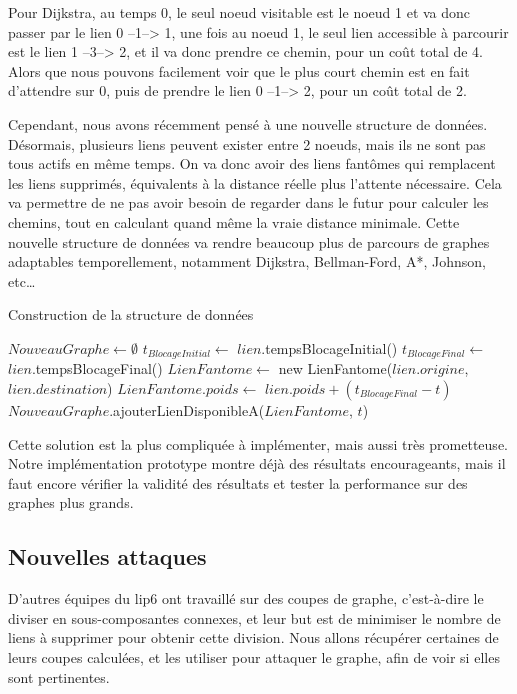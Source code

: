 Pour Dijkstra, au temps 0, le seul noeud visitable est le noeud 1 et va donc passer par le lien 0 --1--> 1, une fois au noeud 1, le seul lien accessible à parcourir est le lien 1 --3--> 2, et il va donc prendre ce chemin, pour un coût total de 4.
Alors que nous pouvons facilement voir que le plus court chemin est en fait d'attendre sur 0, puis de prendre le lien 0 --1--> 2, pour un coût total de 2.

Cependant, nous avons récemment pensé à une nouvelle structure de données.
Désormais, plusieurs liens peuvent exister entre 2 noeuds, mais ils ne sont pas tous actifs en même temps.
On va donc avoir des liens fantômes qui remplacent les liens supprimés, équivalents à la distance réelle plus l'attente nécessaire.
Cela va permettre de ne pas avoir besoin de regarder dans le futur pour calculer les chemins, tout en calculant quand même la vraie distance minimale.
Cette nouvelle structure de données va rendre beaucoup plus de parcours de graphes adaptables temporellement, notamment Dijkstra, Bellman-Ford, A*, Johnson, etc\dots

\begin{algorithm}[H]
\caption{Construction de la structure de données}
\begin{algorithmic}
\State $NouveauGraphe \gets \emptyset$
    \State $t_{BlocageInitial} \gets$ $lien$.tempsBlocageInitial()
    \State $t_{BlocageFinal} \gets$ $lien$.tempsBlocageFinal()
        \State $LienFantome \gets$ new LienFantome($lien.origine$, $lien.destination$)
        \State $LienFantome.poids \gets$ $lien.poids + (t_{BlocageFinal} - t)$
        \State $NouveauGraphe$.ajouterLienDisponibleA($LienFantome$, $t$)
    \EndFor
\EndFor
\end{algorithmic}
\end{algorithm}

Cette solution est la plus compliquée à implémenter, mais aussi très prometteuse.
Notre implémentation prototype montre déjà des résultats encourageants, mais il faut encore vérifier la validité des résultats et tester la performance sur des graphes plus grands.

\subsection{Nouvelles attaques}\label{subsec:nouvelles_attaques}
D'autres équipes du lip6 ont travaillé sur des coupes de graphe, c'est-à-dire le diviser en sous-composantes connexes, et leur but est de minimiser le nombre de liens à supprimer pour obtenir cette division.
Nous allons récupérer certaines de leurs coupes calculées, et les utiliser pour attaquer le graphe, afin de voir si elles sont pertinentes.

